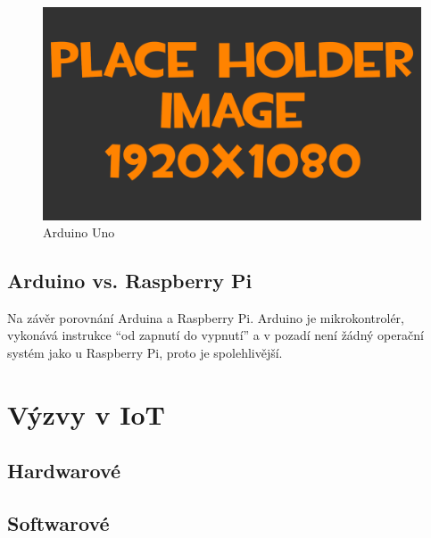 \begin{figure}[h!]
	\centering
	\includegraphics[width=\textwidth]{pictures/placeHolderFHD.png}
    	\caption{Arduino Uno}
   	\label{fig:arduinoUno}
\end{figure}	

\subsection{Arduino vs. Raspberry Pi}
Na závěr porovnání Arduina a Raspberry Pi. Arduino je mikrokontrolér, vykonává instrukce “od zapnutí do vypnutí” a v pozadí není žádný operační systém jako u Raspberry Pi, proto je spolehlivější.






\section{Výzvy v IoT}
\subsection{Hardwarové}
\subsection{Softwarové}
